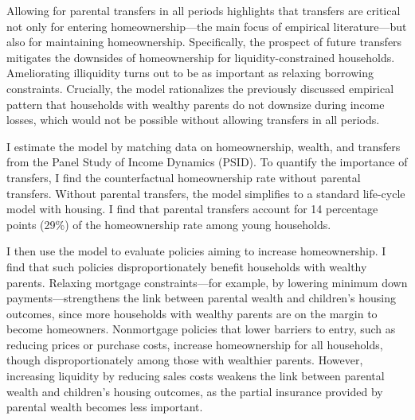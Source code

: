 \documentclass[12pt]{article}
\begin{document}
Allowing for parental transfers in all periods highlights that transfers are critical not only for entering homeownership---the main focus of empirical literature---but also for maintaining homeownership. Specifically, the prospect of future transfers mitigates the downsides of homeownership for liquidity-constrained households. Ameliorating illiquidity turns out to be as important as relaxing borrowing constraints. Crucially, the model rationalizes the previously discussed empirical pattern that households with wealthy parents do not downsize during income losses, which would not be possible without allowing transfers in all periods. 

I estimate the model by matching data on homeownership, wealth, and transfers from the Panel Study of Income Dynamics (PSID). To quantify the importance of transfers, I find the counterfactual homeownership rate without parental transfers. Without parental transfers, the model simplifies to a standard life-cycle model with housing. I find that parental transfers account for 14 percentage points (29\%) of the homeownership rate among young households. 

I then use the model to evaluate policies aiming to increase homeownership. I find that such policies disproportionately benefit households with wealthy parents. Relaxing mortgage constraints---for example, by lowering minimum down payments---strengthens the link between parental wealth and children's housing outcomes, since more households with wealthy parents are on the margin to become homeowners. Nonmortgage policies that lower barriers to entry, such as reducing prices or purchase costs, increase homeownership for all households, though disproportionately among those with wealthier parents. However, increasing liquidity by reducing sales costs weakens the link between parental wealth and children's housing outcomes, as the partial insurance provided by parental wealth becomes less important.
\end{document}
